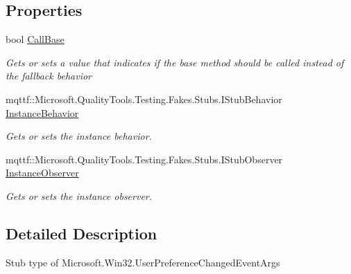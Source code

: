 \subsection*{Properties}
\begin{DoxyCompactItemize}
\item 
bool \hyperlink{class_microsoft_1_1_win32_1_1_fakes_1_1_stub_user_preference_changed_event_args_a06efd39e2923235044e5ad08cc153cfb}{Call\-Base}
\begin{DoxyCompactList}\small\item\em Gets or sets a value that indicates if the base method should be called instead of the fallback behavior\end{DoxyCompactList}\item 
mqttf\-::\-Microsoft.\-Quality\-Tools.\-Testing.\-Fakes.\-Stubs.\-I\-Stub\-Behavior \hyperlink{class_microsoft_1_1_win32_1_1_fakes_1_1_stub_user_preference_changed_event_args_a0b6219be92f0e62138280e5881db3caf}{Instance\-Behavior}
\begin{DoxyCompactList}\small\item\em Gets or sets the instance behavior.\end{DoxyCompactList}\item 
mqttf\-::\-Microsoft.\-Quality\-Tools.\-Testing.\-Fakes.\-Stubs.\-I\-Stub\-Observer \hyperlink{class_microsoft_1_1_win32_1_1_fakes_1_1_stub_user_preference_changed_event_args_ac230d55b956ebd7bee80eec84f5649a5}{Instance\-Observer}
\begin{DoxyCompactList}\small\item\em Gets or sets the instance observer.\end{DoxyCompactList}\end{DoxyCompactItemize}


\subsection{Detailed Description}
Stub type of Microsoft.\-Win32.\-User\-Preference\-Changed\-Event\-Args



